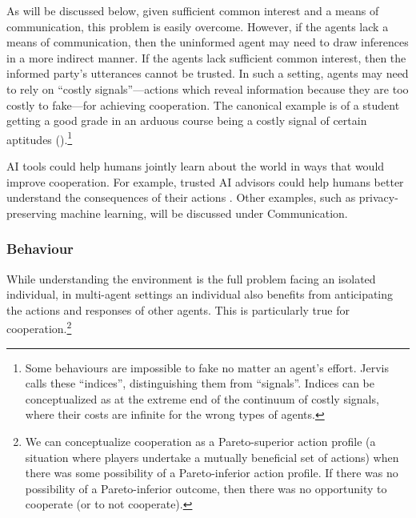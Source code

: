\documentclass[11pt, a4paper, logo, onecolumn, nonumbering]{deepmind}
\begin{document}
As will be discussed below, given sufficient common interest and a means of communication, this problem is easily overcome. However, if the agents lack a means of communication, then the uninformed agent may need to draw inferences in a more indirect manner. If the agents lack sufficient common interest, then the informed party's utterances cannot be trusted. In such a setting, agents may need to rely on ``costly signals''---actions which reveal information because they are too costly to fake---for achieving cooperation. The canonical example is of a student getting a good grade in an arduous course being a costly signal of certain aptitudes (\cite{spense1973job, zahavi1977reliability, barclay2013strategies}).\footnote{Some behaviours are impossible to fake no matter an agent's effort. Jervis \cite{jervis1989logic} calls these ``indices'', distinguishing them from ``signals''. Indices can be conceptualized as at the extreme end of the continuum of costly signals, where their costs are infinite for the wrong types of agents.}

AI tools could help humans jointly learn about the world in ways that would improve cooperation. For example, trusted AI advisors could help humans better understand the consequences of their actions \cite[320]{harari2016homo}.%
Other examples, such as privacy-preserving machine learning, will be discussed under Communication. 





\subsubsection{Behaviour}

While understanding the environment is the full problem facing an isolated individual, in multi-agent settings an individual also benefits from anticipating the actions and responses of other agents. This is particularly true for cooperation.\footnote{We can conceptualize cooperation as a Pareto-superior action profile (a situation where players undertake a mutually beneficial set of actions) when there was some possibility of a Pareto-inferior action profile. If there was no possibility of a Pareto-inferior outcome, then there was no opportunity to cooperate (or to not cooperate).} 
\end{document}
